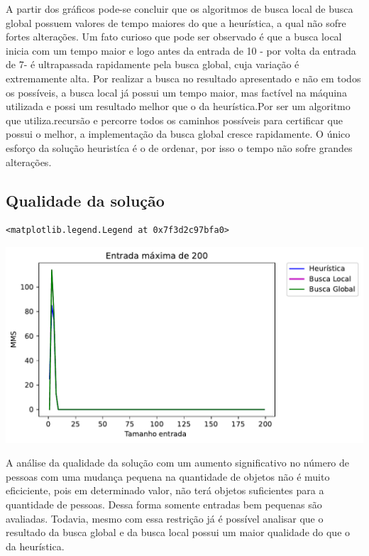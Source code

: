 \documentclass[a4paper,11pt,final]{article}
\begin{document}
A partir dos gráficos pode-se concluir que os algoritmos de busca local de busca global possuem 
valores de tempo maiores do que a heurística, a qual não sofre fortes alterações. Um fato curioso que pode ser
observado é que a busca local inicia com um tempo maior e logo antes da entrada de 10  - por volta da entrada de 7- 
é ultrapassada rapidamente pela busca global, cuja variação é extremamente alta. Por realizar a busca no resultado 
apresentado e não em todos os possíveis, a busca local já possui um tempo maior, mas factível na máquina utilizada 
e possi um resultado melhor que o da heurística.Por ser um algoritmo que utiliza.recursão e percorre todos 
os caminhos possíveis para certificar que possui o melhor, a implementação da busca global
cresce rapidamente. O único esforço da solução heuristíca é o de ordenar, por isso o tempo não sofre grandes alterações.

\subsection{Qualidade da solução}


\begin{verbatim}
<matplotlib.legend.Legend at 0x7f3d2c97bfa0>
\end{verbatim}
\includegraphics[width= 15 cm]{figures/teste_figure6_1.pdf}


A análise da qualidade da solução com um aumento significativo no número de pessoas com uma mudança pequena
na quantidade de objetos não é muito eficiciente, pois em determinado valor, não terá objetos suficientes 
para a quantidade de pessoas. Dessa forma somente entradas bem pequenas são avaliadas. Todavia, mesmo com 
essa restrição já é possível analisar que o resultado da busca global e da busca local possui um maior 
qualidade do que o da heurística. 
\end{document}
